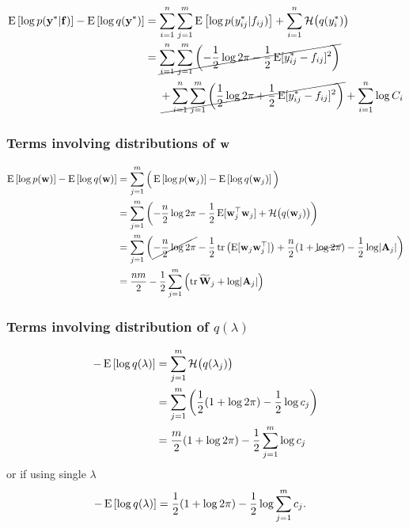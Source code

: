\begin{align*}
  \E\left[ \log p(\by^* | \bff) \right] - \E\left[ \log q(\by^*) \right]
  &= \sum_{i=1}^n \sum_{j=1}^m \E \left[ \log p(y_{ij}^* | f_{ij}) \right] + \sum_{i=1}^n \cH\big(q(y_i^*)\big) \\
  &= \cancel{\sum_{i=1}^n \sum_{j=1}^m \left( -\half\log 2\pi -\half \E[y_{ij}^* - f_{ij}]^2 \right)} \\
  &\phantom{==} \cancel{+ \sum_{i=1}^n \sum_{j=1}^m \left( \half\log 2\pi + \half \E[y_{ij}^* - f_{ij}]^2 \right)} + \sum_{i=1}^n \log C_i \\
\end{align*}

\subsubsection{Terms involving distributions of $\bw$}

\begin{align*}
  \E\left[ \log p(\bw) \right] - \E\left[ \log q(\bw) \right]
  &= \sum_{j=1}^m \Big( \E\left[ \log p(\bw_j) \right] - \E\left[ \log q(\bw_j) \right] \Big)  \\
  &= \sum_{j=1}^m \left( -\half[n] \log 2\pi - \half \E[\bw_j^\top\bw_j] + \cH\big(q(\bw_j)\big) \right) \\
  &= \sum_{j=1}^m \left( \cancel{-\half[n] \log 2\pi} - \half\tr\left( \E[\bw_j\bw_j^\top]\right) + \half[n] (1 + \cancel{\log 2\pi}) - \half \log \abs{\bA_j} \right) \\
  &= \half[nm] - \half \sum_{j=1}^m \left( \tr \btW_j + \log \abs{\bA_j} \right)
\end{align*}

\subsubsection{Terms involving distribution of $q(\lambda)$}

\begin{align*}
  -\E\left[ \log q(\lambda) \right] 
  &= \sum_{j=1}^m \cH\big(q(\lambda_j)\big)  \\
  &= \sum_{j=1}^m \left( \half (1 + \log 2\pi) - \half \log c_j \right) \\
  &= \half[m](1 + \log 2\pi) - \half \sum_{j=1}^m \log c_j
\end{align*}
or if using single $\lambda$
\begin{align*}
  -\E\left[ \log q(\lambda) \right] 
  &= \half(1 + \log 2\pi) - \half  \log  \sum_{j=1}^m c_j .
\end{align*}

